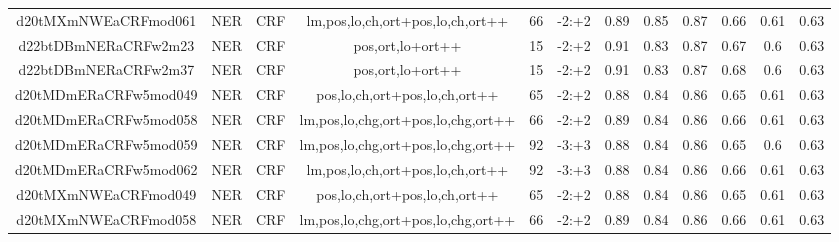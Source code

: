 \documentclass[a4paper]{article}
\begin{document}
\begin{landscape}
\begin{center}
\begin{tabular}{ |c|c|c|c|c|c|c|c|c|c|c|c|}
 
 	
 	\small{ d20tMXmNWEaCRFmod061 } & \small{ NER} & \small{  CRF }  & lm,pos,lo,ch,ort+pos,lo,ch,ort++  &  66 &  \small{  -2:+2 }  &  0.89 & 0.85 & 0.87  &  0.66 & 0.61 & 0.63 \\
 	

 
 	
 	\small{ d22btDBmNERaCRFw2m23 } & \small{ NER} & \small{  CRF }  & pos,ort,lo+ort++  &  15 &  \small{  -2:+2 }  &  0.91 & 0.83 & 0.87  &  0.67 & 0.6 & 0.63 \\
 	

 
 	
 	\small{ d22btDBmNERaCRFw2m37 } & \small{ NER} & \small{  CRF }  & pos,ort,lo+ort++  &  15 &  \small{  -2:+2 }  &  0.91 & 0.83 & 0.87  &  0.68 & 0.6 & 0.63 \\
 	

 
 	
 	\small{ d20tMDmERaCRFw5mod049 } & \small{ NER} & \small{  CRF }  & pos,lo,ch,ort+pos,lo,ch,ort++  &  65 &  \small{  -2:+2 }  &  0.88 & 0.84 & 0.86  &  0.65 & 0.61 & 0.63 \\
 	

 
 	
 	\small{ d20tMDmERaCRFw5mod058 } & \small{ NER} & \small{  CRF }  & lm,pos,lo,chg,ort+pos,lo,chg,ort++  &  66 &  \small{  -2:+2 }  &  0.89 & 0.84 & 0.86  &  0.66 & 0.61 & 0.63 \\
 	

 
 	
 	\small{ d20tMDmERaCRFw5mod059 } & \small{ NER} & \small{  CRF }  & lm,pos,lo,chg,ort+pos,lo,chg,ort++  &  92 &  \small{  -3:+3 }  &  0.88 & 0.84 & 0.86  &  0.65 & 0.6 & 0.63 \\
 	

 
 	
 	\small{ d20tMDmERaCRFw5mod062 } & \small{ NER} & \small{  CRF }  & lm,pos,lo,ch,ort+pos,lo,ch,ort++  &  92 &  \small{  -3:+3 }  &  0.88 & 0.84 & 0.86  &  0.66 & 0.61 & 0.63 \\
 	

 
 	
 	\small{ d20tMXmNWEaCRFmod049 } & \small{ NER} & \small{  CRF }  & pos,lo,ch,ort+pos,lo,ch,ort++  &  65 &  \small{  -2:+2 }  &  0.88 & 0.84 & 0.86  &  0.65 & 0.61 & 0.63 \\
 	

 
 	
 	\small{ d20tMXmNWEaCRFmod058 } & \small{ NER} & \small{  CRF }  & lm,pos,lo,chg,ort+pos,lo,chg,ort++  &  66 &  \small{  -2:+2 }  &  0.89 & 0.84 & 0.86  &  0.66 & 0.61 & 0.63 \\
 	


\end{tabular}
\end{center}
\end{landscape}
\end{document}
